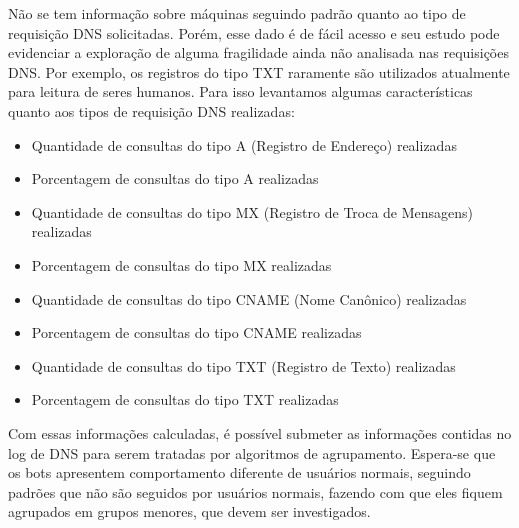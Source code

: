 Não se tem informação sobre máquinas seguindo padrão quanto ao tipo de requisição DNS solicitadas. Porém, esse dado é de fácil acesso e seu estudo pode evidenciar a exploração de alguma fragilidade ainda não analisada nas requisições DNS. Por exemplo, os registros do tipo TXT raramente são utilizados atualmente para leitura de seres humanos. Para isso levantamos algumas características quanto aos tipos de requisição DNS realizadas:

\begin{itemize}
\item Quantidade de consultas do tipo A (Registro de Endereço) realizadas
\item Porcentagem de consultas do tipo A realizadas
\item Quantidade de consultas do tipo MX (Registro de Troca de Mensagens) realizadas
\item Porcentagem de consultas do tipo MX realizadas
\item Quantidade de consultas do tipo CNAME (Nome Canônico) realizadas
\item Porcentagem de consultas do tipo CNAME realizadas
\item Quantidade de consultas do tipo TXT (Registro de Texto) realizadas
\item Porcentagem de consultas do tipo TXT realizadas
\end{itemize}

Com essas informações calculadas, é possível submeter as informações contidas no log de DNS para serem tratadas por algoritmos de agrupamento. Espera-se que os bots apresentem comportamento diferente de usuários normais, seguindo padrões que não são seguidos por usuários normais, fazendo com que eles fiquem agrupados em grupos menores, que devem ser investigados.
